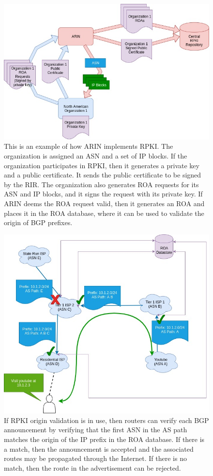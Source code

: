 \documentclass[conference]{IEEEtran}
\begin{document}
\begin{figure}[hp]
  \includegraphics[width=\linewidth]{images/rir-rpki-assignments.jpg}
  \caption{This is an example of how ARIN implements RPKI.  The organization is assigned an ASN and a set of IP blocks.  If the organization participates in RPKI, then it generates a private key and a public certificate.  It sends the public certificate to be signed by the RIR.  The organization also generates ROA requests for its ASN and IP blocks, and it signs the request with its private key.  If ARIN deems the ROA request valid, then it generates an ROA and places it in the ROA database, where it can be used to validate the origin of BGP prefixes.}
  \label{fig:rpki-assignment}
\end{figure}

\begin{figure}[hp]
  \includegraphics[width=\linewidth]{images/rpki-ops.jpg}
  \caption{If RPKI origin validation is in use, then routers can verify each BGP announcement by verifying that the first ASN in the AS path matches the origin of the IP prefix in the ROA database.  If there is a match, then the announcement is accepted and the associated routes may be propagated through the Internet.  If there is no match, then the route in the advertisement can be rejected.}
  \label{fig:rpki-ops}
\end{figure}
\end{document}

